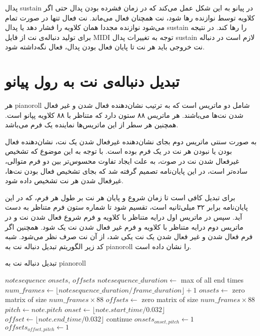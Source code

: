 پدال \gls{sustain} در پیانو به این شکل عمل می‌کند که در زمان فشرده بودن پدال حتی
اگر کلاویه توسط نوازنده رها شود، نت همچنان فعال می‌ماند. نت فعال تنها در صورت
تمام می‌شود نوازنده مجددا همان کلاویه را فشار دهد یا پدال \gls{sustain} را رها
کند. در نتیجه برای تولید دنباله‌ی نت از فایل \gls{MIDI} توجه به تغییرات پدال
\gls{sustain} لازم است در دنباله نت خروجی باید هر نت تا پایان فعال بودن پدال،
فعال نگه‌داشته شود.

\section{تبدیل دنباله‌ی نت به رول پیانو}
هر \gls{pianoroll} شامل دو ماتریس است که به ترتیب نشان‌دهنده فعال شدن و غیر فعال
شدن نت‌ها می‌باشند. هر ماتریس ۸۸ ستون دارد که متناظر با ۸۸ کلاویه پپانو است.
همچنین هر سطر از این ماتریس‌ها نماینده یک فرم می‌باشد.

به صورت سنتی ماتریس دوم بجای نشان‌دهنده غیرفعال شدن یک نت، نشان‌دهنده فعال بودن
یا نبودن هر نت در یک فرم بوده است. با توجه به این موضوع که تشخیص غیرفعال شدن نت
در صوت، به علت ایجاد تفاوت محسوس‌تر بین دو فرم متوالی، ساده‌تر است، در این
پایان‌نامه تصمیم گرفته شد که بجای تشخیص فعال بودن نت‌ها، غیرفعال شدن هر نت تشخیص
داده شود.

برای تبدیل کافی است تا زمان شروع و پایان هر نت بر طول هر فرم، که در این
پایان‌نامه برابر ۳۲ میلی‌ثانیه است، تقسیم شود تا شماره ستون فرم متناظر به دست
آید. سپس در ماتریس اول درایه متناظر با کلاویه و فرم شروع فعال شدن نت و در ماتریس
دوم درایه متناظر با کلاویه و فرم غیر فعال شدن نت یک شود. همچنین اگر فرم فعال شدن
و غیر فعال شدن یک نت یکی شد، از آن نت صرف نظر می‌شود. شبه کد زیر الگوریتم تبدیل
دنباله نت به \gls{pianoroll} را نشان داده است.

\begin{algorithm}[ht]
\caption{تبدیل دنباله نت به \gls{pianoroll}}
\begin{algorithmic}
\begin{latin}
    \Require $notesequence$
    \Ensure $onsets$, $offsets$
    \State $notesequence\_duration \leftarrow$ max of all end times
    \State $num\_frames \leftarrow \lfloor notesequence\_duration / frame\_duration \rfloor + 1$
    \State $onsets \leftarrow$ zero matrix of size $num\_frames \times 88$
    \State $offsets \leftarrow$ zero matrix of size $num\_frames \times 88$
        \State $pitch \leftarrow note.pitch$
        \State $onset \leftarrow \lfloor note.start\_time / 0.032 \rfloor$
        \State $offset \leftarrow \lfloor note.end\_time / 0.032 \rfloor$
            \State continue
        \EndIf
        \State $onsets_{onset, pitch} \leftarrow 1$
        \State $offsets_{offset, pitch} \leftarrow 1$
    \EndFor
\end{latin}
\end{algorithmic}
\end{algorithm}

